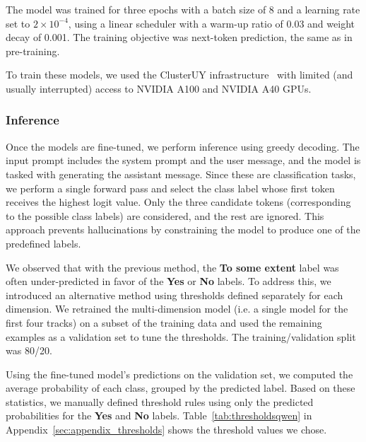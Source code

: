 \documentclass[11pt]{article}
\begin{document}
The model was trained for three epochs with a batch size of 8 and a learning rate set to $2 \times 10^{-4}$, using a linear scheduler with a warm-up ratio of 0.03 and weight decay of 0.001.
The training objective was next-token prediction, the same as in pre-training.

To train these models, we used the ClusterUY infrastructure~\cite{clusteruy} with limited (and usually interrupted) access to NVIDIA A100 and NVIDIA A40 GPUs.






\subsubsection{Inference}





Once the models are fine-tuned, we perform inference using greedy decoding.
The input prompt includes the system prompt and the user message, and the model is tasked with generating the assistant message.
Since these are classification tasks, we perform a single forward pass and select the class label whose first token receives the highest logit value.
Only the three candidate tokens (corresponding to the possible class labels) are considered, and the rest are ignored.
This approach prevents hallucinations by constraining the model to produce one of the predefined labels.

We observed that with the previous method, the \textbf{To some extent} label was often under-predicted in favor of the \textbf{Yes} or \textbf{No} labels.
To address this, we introduced an alternative method using thresholds defined separately for each dimension.
We retrained the multi-dimension model (i.e. a single model for the first four tracks) on a subset of the training data and used the remaining examples as a validation set to tune the thresholds.
The training/validation split was 80/20.

Using the fine-tuned model’s predictions on the validation set, we computed the average probability of each class, grouped by the predicted label.
Based on these statistics, we manually defined threshold rules using only the predicted probabilities for the \textbf{Yes} and \textbf{No} labels.
Table~\ref{tab:thresholdsqwen} in Appendix~\ref{sec:appendix_thresholds} shows the threshold values we chose.
\end{document}
